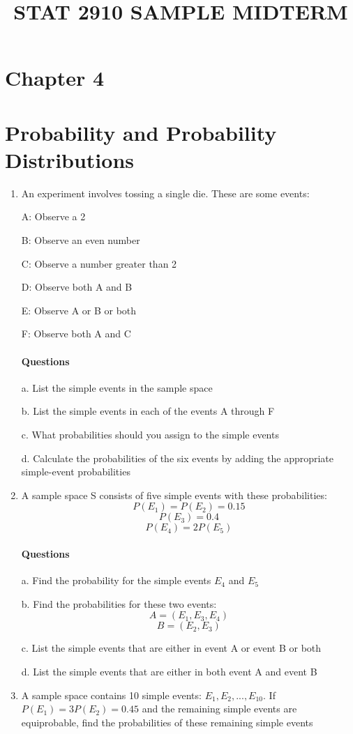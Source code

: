 \documentclass{article}
\title{STAT 2910 SAMPLE MIDTERM}
\begin{document}
\maketitle

\section*{Chapter 4}
\section*{Probability and Probability Distributions}

\begin{enumerate}
    \item An experiment involves tossing a single die. These are some events:
    
    A: Observe a 2

    B: Observe an even number

    C: Observe a number greater than 2

    D: Observe both A and B

    E: Observe A or B or both

    F: Observe both A and C
    
\paragraph*{Questions} 

    
    
    \hfill \break a. List the simple events in the sample space

    b. List the simple events in each of the events A through F

    c. What probabilities should you assign to the simple events

    d. Calculate the probabilities of the six events by adding the appropriate simple-event probabilities
    
    \item A sample space S consists of five simple events with these probabilities:
    $$P(E_1) = P(E_2) = 0.15$$
    $$P(E_3) = 0.4$$
    $$P(E_4) = 2P(E_5)$$
    \paragraph*{Questions}
    
    \hfill \break a. Find the probability for the simple events $E_4$ and $E_5$
    
    b. Find the probabilities for these two events:
        $$A = (E_1, E_3, E_4)$$
        $$B = (E_2, E_3)$$
   
    c. List the simple events that are either in event A or event B or both

    d. List the simple events that are either in both event A and event B
    
    \item A sample space contains 10 simple events: $E_1, E_2,...,E_10$. If $P(E_1) = 3P(E_2) = 0.45$ and the remaining simple events are equiprobable, find the probabilities of these remaining simple events
\end{enumerate}
\end{document}
